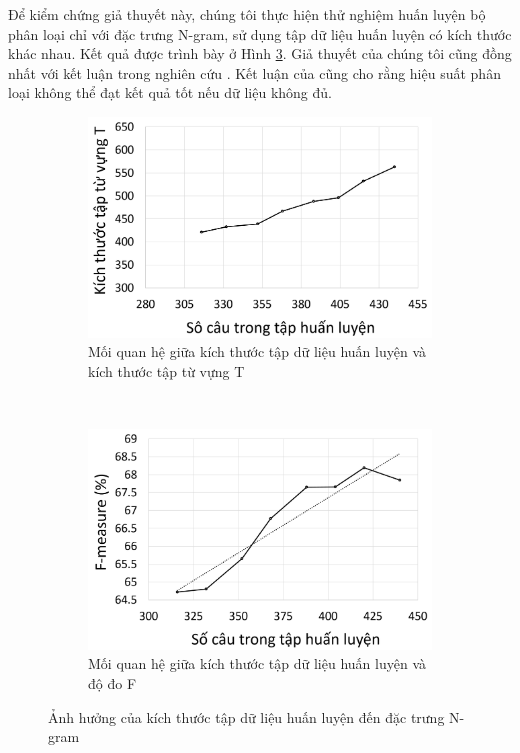 Để kiểm chứng giả thuyết này, chúng tôi thực hiện thử nghiệm huấn luyện bộ phân loại chỉ với đặc trưng N-gram, sử dụng tập dữ liệu huấn luyện có kích thước khác nhau. Kết quả được trình bày ở Hình \ref{fig:so-cau-vs-ngram}. Giả thuyết của chúng tôi cũng đồng nhất với kết luận trong nghiên cứu \cite{sarker2011outcome}. Kết luận của \cite{Mate2016} cũng cho rằng hiệu suất phân loại không thể đạt kết quả tốt nếu dữ liệu không đủ.
\begin{figure}[h]
\begin{subfigure}[h]{0.45\textwidth}
\centering
\includegraphics[scale=0.15]{../hinh/socau_vs_tuvung.png}
\caption{Mối quan hệ giữa kích thước tập dữ liệu huấn luyện và kích thước tập từ vựng T} \label{fig:so-cau-vs-tu-vung}
\end{subfigure}
~
\begin{subfigure}[h]{0.45\textwidth}
\centering
\includegraphics[scale=0.15]{../hinh/socau_vs_f.png}
\caption{Mối quan hệ giữa kích thước tập dữ liệu huấn luyện và độ đo F} \label{fig:so-cau-vs-f}
\end{subfigure}
\caption{Ảnh hưởng của kích thước tập dữ liệu huấn luyện đến đặc trưng N-gram} \label{fig:so-cau-vs-ngram}
\end{figure}


